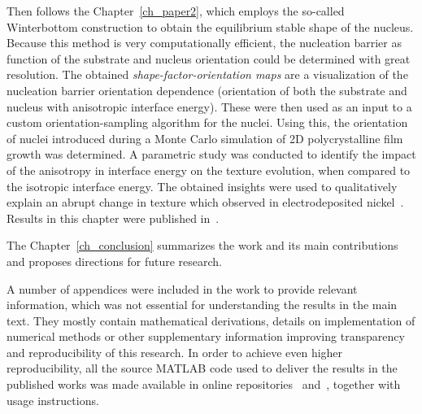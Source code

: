 Then follows the Chapter~\ref{ch_paper2}, which employs the so-called Winterbottom construction to obtain the equilibrium stable shape of the nucleus. Because this method is very computationally efficient, the nucleation barrier as function of the substrate and nucleus orientation could be determined with great resolution. The obtained \textit{shape-factor-orientation maps} are a visualization of the nucleation barrier orientation dependence (orientation of both the substrate and nucleus with anisotropic interface energy). These were then used as an input to a custom orientation-sampling algorithm for the nuclei. Using this, the orientation of nuclei introduced during a Monte Carlo simulation of 2D polycrystalline film growth was determined. A parametric study was conducted to identify the impact of the anisotropy in interface energy on the texture evolution, when compared to the isotropic interface energy. The obtained insights were used to qualitatively explain an abrupt change in texture which observed in electrodeposited nickel~\cite{Alimadadi2016}. Results in this chapter were published in~\cite{Minar2024}. 

The Chapter~\ref{ch_conclusion} summarizes the work and its main contributions and proposes directions for future research.

A number of appendices were included in the work to provide relevant information, which was not essential for understanding the results in the main text. They mostly contain mathematical derivations, details on implementation of numerical methods or other supplementary information improving transparency and reproducibility of this research. In order to achieve even higher reproducibility, all the source MATLAB code used to deliver the results in the published works was made available in online repositories~\cite{Minar2022dataset} and~\cite{Minar2023dataset}, together with usage instructions.




%


